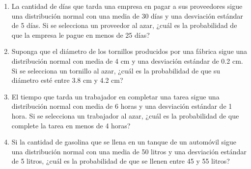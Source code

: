 \begin{Ejer}
\begin{enumerate}
    \item La cantidad de días que tarda una empresa en pagar a sus proveedores sigue una distribución normal con una media de 30 días y una desviación estándar de 5 días. Si se selecciona un proveedor al azar, ¿cuál es la probabilidad de que la empresa le pague en menos de 25 días?

    \item Suponga que el diámetro de los tornillos producidos por una fábrica sigue una distribución normal con media de 4 cm y una desviación estándar de 0.2 cm. Si se selecciona un tornillo al azar, ¿cuál es la probabilidad de que su diámetro esté entre 3.8 cm y 4.2 cm?

    \item El tiempo que tarda un trabajador en completar una tarea sigue una distribución normal con media de 6 horas y una desviación estándar de 1 hora. Si se selecciona un trabajador al azar, ¿cuál es la probabilidad de que complete la tarea en menos de 4 horas?

    \item Si la cantidad de gasolina que se llena en un tanque de un automóvil sigue una distribución normal con una media de 50 litros y una desviación estándar de 5 litros, ¿cuál es la probabilidad de que se llenen entre 45 y 55 litros?

\end{enumerate}

\end{Ejer}




